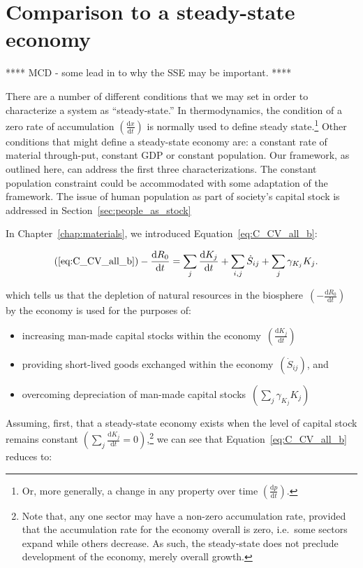 \section{Comparison to a steady-state economy}
\label{sec:SSE}

**** MCD - some lead in to why the SSE may be important. ****

There are a number of different
conditions that we may set
in order to characterize a system as ``steady-state.''
In thermodynamics,
the condition of a zero rate of accumulation
$\left(\frac{\mathrm{d}x}{\mathrm{d}t}\right)$
is normally used to define steady state.\footnote{Or,
more generally,
a change in any property over time
$\left(\frac{\mathrm{d}p}{\mathrm{d}t}\right)$.}
Other conditions that might define a steady-state
economy are:
a constant rate of material through-put,
constant GDP or constant population.
Our framework,
as outlined here,
can address the first three characterizations.
The constant population constraint could be
accommodated with some adaptation of the 
framework. 
The issue of human population as part of society's
capital stock is addressed in Section~\ref{sec:people_as_stock}

In Chapter~\ref{chap:materials}, 
we introduced Equation~\ref{eq:C_CV_all_b}:

\begin{align}\tag{\ref{eq:C_CV_all_b}}
	- \frac{\mathrm{d}R_{0}}{\mathrm{d}t}										&
	=\sum_{j}\frac{\mathrm{d}K_{j}}{\mathrm{d}t}
	+ \sum_{i,j}\dot{S}_{ij}
	+ \sum_{j}\gamma_{K_{j}}K_{j}.
\end{align}

\noindent{}which tells us that 
the depletion of natural resources in the 
biosphere~$\left(- \frac{\mathrm{d}R_{0}}{\mathrm{d}t}\right)$
by the economy
is used for the purposes of:

\begin{itemize}
	\item increasing man-made capital stocks
	within the economy~$\left(\frac{\mathrm{d}K_{j}}{\mathrm{d}t}\right)$
	\item providing short-lived goods exchanged within the
	economy~$\left(\dot{S}_{ij}\right)$, and
	\item overcoming depreciation of man-made
	capital stocks~$\left(\sum\limits_{j}\gamma_{K_{j}}K_{j}\right)$ 
\end{itemize}

Assuming,
first,
that a steady-state economy exists when the level
of capital stock remains constant
$\left(\sum_{j}\frac{\mathrm{d}K_{j}}{\mathrm{d}t}=0\right)$,\footnote{Note
that,
any one sector may have a non-zero accumulation rate,
provided that the  accumulation rate for the economy overall is zero,
i.e.\ some sectors expand while others decrease.
As such,
the steady-state does not preclude development of the economy,
merely overall growth.}
we can see that Equation~\ref{eq:C_CV_all_b}
reduces to:

